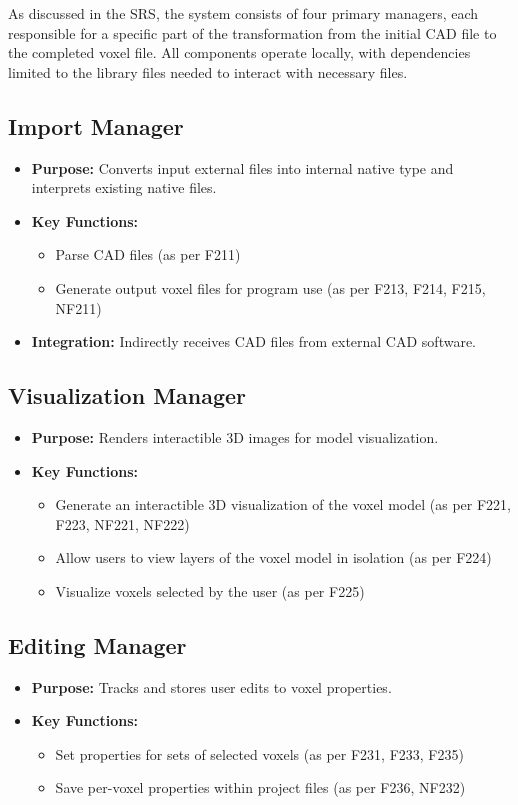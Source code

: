\documentclass{article}
\begin{document}
As discussed in the SRS, the system consists of four primary managers, each responsible
for a specific part of the transformation from the initial CAD file to the completed 
voxel file. All components operate locally, with dependencies limited to
the library files needed to interact with necessary files.

\subsection{Import Manager}
\begin{itemize}
    \item \textbf{Purpose:} Converts input external files into internal native type and interprets existing native files.
    \item \textbf{Key Functions:} 
    \begin{itemize}
        \item Parse CAD files (as per F211)
        \item Generate output voxel files for program use (as per F213, F214, F215, NF211)
    \end{itemize}
    \item \textbf{Integration:} Indirectly receives CAD files from external CAD software.
\end{itemize}

\subsection{Visualization Manager}
\begin{itemize}
    \item \textbf{Purpose:} Renders interactible 3D images for model visualization.
    \item \textbf{Key Functions:} 
    \begin{itemize}
        \item Generate an interactible 3D visualization of the voxel model (as per F221, F223, NF221, NF222)
        \item Allow users to view layers of the voxel model in isolation (as per F224)
        \item Visualize voxels selected by the user (as per F225)
    \end{itemize}
\end{itemize}

\subsection{Editing Manager}
\begin{itemize}
    \item \textbf{Purpose:} Tracks and stores user edits to voxel properties.
    \item \textbf{Key Functions:} 
    \begin{itemize}
        \item Set properties for sets of selected voxels (as per F231, F233, F235)
        \item Save per-voxel properties within project files (as per F236, NF232)
    \end{itemize}
\end{itemize}
\end{document}
